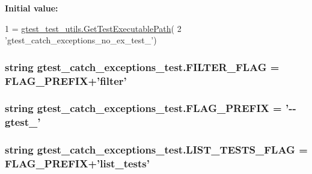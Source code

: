 {\bfseries Initial value\-:}
\begin{DoxyCode}
1 = \hyperlink{namespacegtest__test__utils_a1bdf3cac86afa675ed37629b183048e9}{gtest\_test\_utils.GetTestExecutablePath}(
2     \textcolor{stringliteral}{'gtest\_catch\_exceptions\_no\_ex\_test\_'})
\end{DoxyCode}
\hypertarget{namespacegtest__catch__exceptions__test_a1a53cfa4c10fe3bdbc85a14fd9692751}{
\subsubsection[{F\-I\-L\-T\-E\-R\-\_\-\-F\-L\-A\-G}]{\setlength{\rightskip}{0pt plus 5cm}string gtest\-\_\-catch\-\_\-exceptions\-\_\-test.\-F\-I\-L\-T\-E\-R\-\_\-\-F\-L\-A\-G = {\bf F\-L\-A\-G\-\_\-\-P\-R\-E\-F\-I\-X}+'filter'}}\label{namespacegtest__catch__exceptions__test_a1a53cfa4c10fe3bdbc85a14fd9692751}
\hypertarget{namespacegtest__catch__exceptions__test_a2d40f89077ec9fdb51008c263148315f}{
\subsubsection[{F\-L\-A\-G\-\_\-\-P\-R\-E\-F\-I\-X}]{\setlength{\rightskip}{0pt plus 5cm}string gtest\-\_\-catch\-\_\-exceptions\-\_\-test.\-F\-L\-A\-G\-\_\-\-P\-R\-E\-F\-I\-X = '-\/-\/gtest\-\_\-'}}\label{namespacegtest__catch__exceptions__test_a2d40f89077ec9fdb51008c263148315f}
\hypertarget{namespacegtest__catch__exceptions__test_a68601cbcd48065a2f656eb8552784f0c}{
\subsubsection[{L\-I\-S\-T\-\_\-\-T\-E\-S\-T\-S\-\_\-\-F\-L\-A\-G}]{\setlength{\rightskip}{0pt plus 5cm}string gtest\-\_\-catch\-\_\-exceptions\-\_\-test.\-L\-I\-S\-T\-\_\-\-T\-E\-S\-T\-S\-\_\-\-F\-L\-A\-G = {\bf F\-L\-A\-G\-\_\-\-P\-R\-E\-F\-I\-X}+'list\-\_\-tests'}}\label{namespacegtest__catch__exceptions__test_a68601cbcd48065a2f656eb8552784f0c}
